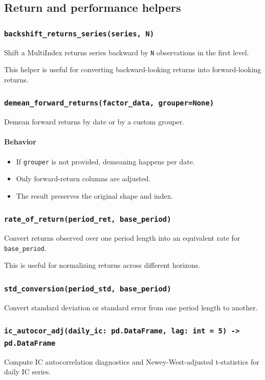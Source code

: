 \documentclass[11pt]{article}
\begin{document}
\subsection{Return and performance helpers}

\subsubsection{\texttt{backshift\_returns\_series(series, N)}}
Shift a MultiIndex returns series backward by \texttt{N} observations in the first level.

This helper is useful for converting backward-looking returns into forward-looking returns.

\subsubsection{\texttt{demean\_forward\_returns(factor\_data, grouper=None)}}
Demean forward returns by date or by a custom grouper.

\paragraph{Behavior}
\begin{itemize}
  \item If \texttt{grouper} is not provided, demeaning happens per date.
  \item Only forward-return columns are adjusted.
  \item The result preserves the original shape and index.
\end{itemize}

\subsubsection{\texttt{rate\_of\_return(period\_ret, base\_period)}}
Convert returns observed over one period length into an equivalent rate for \texttt{base\_period}.

This is useful for normalizing returns across different horizons.

\subsubsection{\texttt{std\_conversion(period\_std, base\_period)}}
Convert standard deviation or standard error from one period length to another.

\subsubsection{\texttt{ic\_autocor\_adj(daily\_ic: pd.DataFrame, lag: int = 5) -> pd.DataFrame}}
Compute IC autocorrelation diagnostics and Newey-West-adjusted t-statistics for daily IC series.
\end{document}
